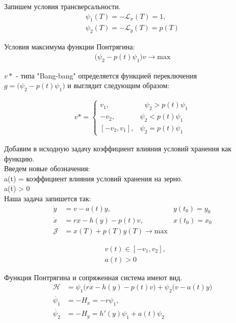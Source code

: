 Запишем  условия трансверсальности.
\begin{align}
    {\psi_{1}(T)} = \mathcal{- L}_x(T)= 1,\\
    {\psi_{2}(T)} = \mathcal {- L}_y(T)= p(T)
\end{align} 


Условия максимума функции Понтрягина:\\
\begin{align}
     \big (\psi_{2} - p(t)\psi_{1} \big )v \to \mathrm{max}
\end{align}


${v*}$ - типа "Bang-bang" определяется функцией переключения\\
$g = \big (\psi_{2} - p(t)\psi_{1} \big)$ и выглядит следующим образом:

\begin{align}
v* = 
 \begin{cases}
   v_{1}, &\text{ $\psi_{2} > p(t)\psi_{1}$}\\
   -v_{2}, &\text{$\psi_{2} < p(t)\psi_{1}$}\\
   [-v_{2},v_{1}], &\text{$\psi_{2} = p(t)\psi_{1}$}
 \end{cases}
\end{align}






Добавим в исходную задачу коэффициент влияния условий хранения как функцию.\\
Введем новые обозначения:\\
{a(t)} = коэффициент влияния условий хранения на зерно.\\
a(t) > 0\\
 Наша задача запишется так:\\

\begin{align}
    \Dot{y} & = v - a(t) y, & y(t_{0}) = y_{0} \\
    \Dot{x} & = r x - h(y) - p(t) v, & x(t_{0}) = x_{0} \\
    \mathcal{J} & = x(T) + p(T) y(T) \to \mathrm{max}
\end{align}

\begin{align}
    & v(t) \in [-v_{1}, v_{2}], \\
    & a(t) > 0
\end{align}

Функция Понтрягина и сопряженная система имеют вид. 
\begin{align}
    \mathcal{H} & = \psi_{1} \big( r x- h(y) - p(t) v \big) + \psi_{2} \big( v - a(t)y \big)\\
    \Dot{\psi_{1}} & = -H_x = -r \psi_{1},\\
    \Dot{\psi_{2}} & = -H_y = h'(y) \psi_{1} +  a(t) \psi_{2}
\end{align} 

